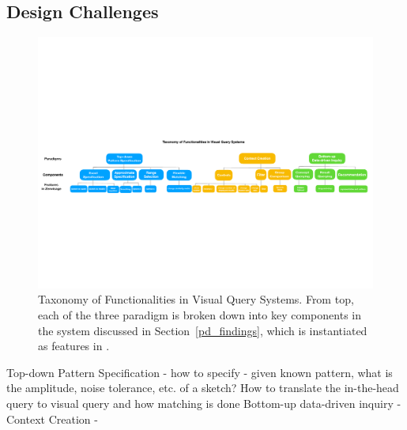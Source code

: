 \subsection{Design Challenges}
\begin{figure}[h!]
  \centering
  \includegraphics[width=\linewidth]{figures/taxonomy.pdf}
  \caption{Taxonomy of Functionalities in Visual Query Systems. From top, each of the three paradigm is broken down into key components in the system discussed in Section~\ref{pd_findings}, which is instantiated as features in \zv.}
  \label{fig:taxonomy}
\end{figure}
Top-down Pattern Specification
- how to specify
- given known pattern, what is the amplitude, noise tolerance, etc. of a sketch? How to translate the in-the-head query to visual query and how matching is done
Bottom-up data-driven inquiry
- 
Context Creation
- 

